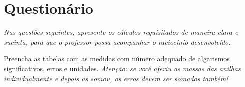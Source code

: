 \cleardoublepage


\vspace{15mm}

\begin{fullwidth}
\noindent{}
\vspace{5mm}

\noindent{}

\noindent{}

\noindent{}

\noindent{}

\noindent{}
\end{fullwidth}

\vspace{5mm}

\section{Questionário}
\emph{Nas questões seguintes, apresente os cálculos requisitados de maneira clara e sucinta, para que o professor possa acompanhar o raciocínio desenvolvido.}
\vspace{5mm}

\begin{question}[type={exam}]{1.5}
Preencha as tabelas com as medidas com número adequado de algarismos significativos, erros e unidades. \emph{Atenção: se você aferiu as massas das anilhas individualmente e depois as somou, os erros devem ser somados também!}
\end{question}

